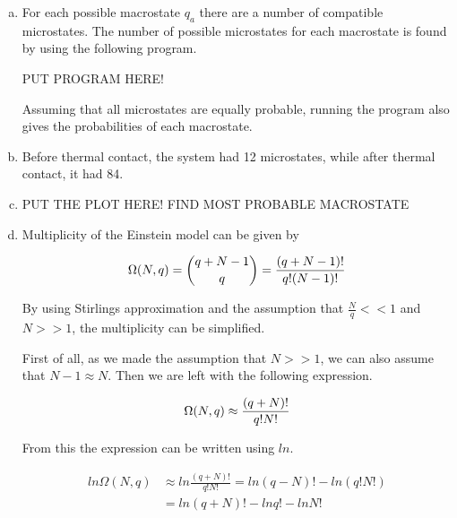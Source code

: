 \documentclass[a4paper,norsk,12pt,oneside]{article}
\begin{document}
\begin{enumerate}[a)]
    \item

        For each possible macrostate \(q_a\) there are a number of compatible microstates. 
        The number of possible microstates for each macrostate is found by using the
        following program. 

        PUT PROGRAM HERE! 

        Assuming that all microstates are equally probable, running the program also
        gives the probabilities of each macrostate.

    \item

        Before thermal contact, the system had 12 microstates, while after thermal 
        contact, it had 84. 

    \item

        PUT THE PLOT HERE! FIND MOST PROBABLE MACROSTATE

    \item

        Multiplicity of the Einstein model can be given by

        \begin{equation}
            \label{eq:2}
            \Omega(N,q) = \binom{q + N -1}{q} = \frac{(q + N - 1)!}{q!(N - 1)!}\\ 
        \end{equation}

        By using Stirlings approximation and the assumption that \(\frac{N}{q}<<1\)
        and \(N>>1\), the multiplicity can be simplified. 

        First of all, as we made the assumption that \(N>>1\), we can also assume that
        \(N -1 \approx N\). Then we are left with the following expression.

         \begin{equation}
            \label{eq:2}
            \Omega(N,q) \approx \frac{(q + N)!}{q!N!}\\ 
        \end{equation}   

        From this the expression can be written using \(ln\). 

        \begin{align*}
             ln\Omega(N,q) &\approx ln\frac{(q + N)!}{q!N!} = ln(q-N)! - ln(q!N!)\\
             & = ln(q + N)! - ln q! - ln N!
        \end{align*}


\end{enumerate}
\end{document}
